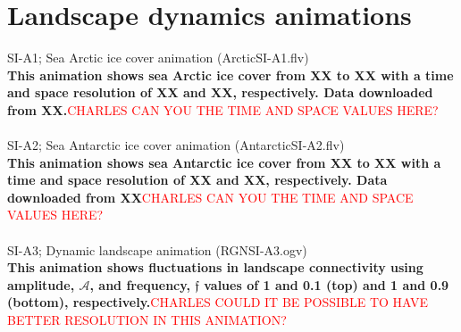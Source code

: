\documentclass[12pt]{article}
\newcommand{\carlos}[1]{\textcolor{Red}{#1}}
\begin{document}
\section*{Landscape dynamics animations}
SI-A1; Sea Arctic ice cover animation (ArcticSI-A1.flv)\\
{\bf This animation shows sea Arctic ice cover from XX to XX with a time and space resolution of XX and XX, respectively. Data downloaded from XX.}\carlos{CHARLES CAN YOU THE TIME AND SPACE VALUES HERE?}
\\
\\
SI-A2; Sea Antarctic ice cover animation (AntarcticSI-A2.flv)\\
{\bf This animation shows sea Antarctic ice cover from XX to XX with a time and space resolution of XX and XX, respectively. Data downloaded from XX}\carlos{CHARLES CAN YOU THE TIME AND SPACE VALUES HERE?}
\\
\\
SI-A3; Dynamic landscape animation (RGNSI-A3.ogv)\\
{\bf This animation shows fluctuations in landscape connectivity using amplitude, $\mathcal{A}$, and frequency, $\mathfrak{f}$ values of 1 and 0.1 (top) and 1 and 0.9 (bottom), respectively.}\carlos{CHARLES COULD IT BE POSSIBLE TO HAVE BETTER RESOLUTION IN THIS ANIMATION?}
\end{document}
